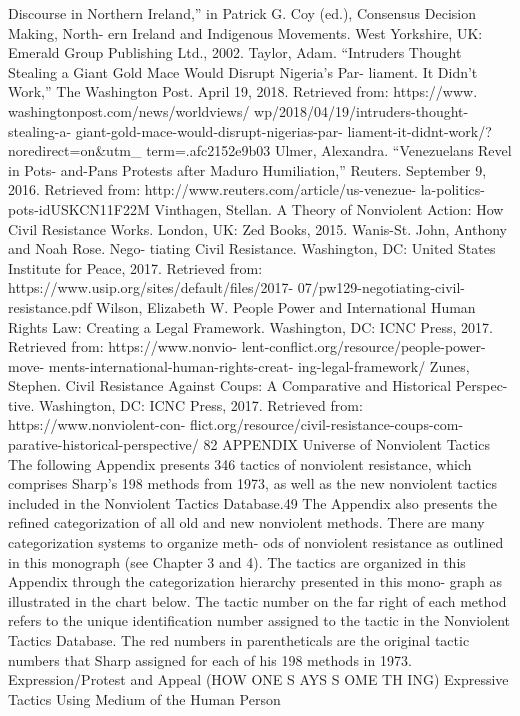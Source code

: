 \documentclass[twoside,a4paper,12pt,fleqn,openany]{extbook}
\begin{document}
Discourse in Northern Ireland,” in Patrick G.
Coy (ed.), Consensus Decision Making, North-
ern Ireland and Indigenous Movements. West
Yorkshire, UK: Emerald Group Publishing
Ltd., 2002.
Taylor, Adam. “Intruders Thought Stealing a
Giant Gold Mace Would Disrupt Nigeria’s Par-
liament. It Didn’t Work,” The Washington Post.
April 19, 2018. Retrieved from: https://www.
washingtonpost.com/news/worldviews/
wp/2018/04/19/intruders-thought-stealing-a-
giant-gold-mace-would-disrupt-nigerias-par-
liament-it-didnt-work/?noredirect=on&utm_
term=.afc2152e9b03
Ulmer, Alexandra. “Venezuelans Revel in Pots-
and-Pans Protests after Maduro Humiliation,”
Reuters. September 9, 2016. Retrieved from:
http://www.reuters.com/article/us-venezue-
la-politics-pots-idUSKCN11F22M
Vinthagen, Stellan. A Theory of Nonviolent
Action: How Civil Resistance Works. London,
UK: Zed Books, 2015.
Wanis-St. John, Anthony and Noah Rose. Nego-
tiating Civil Resistance. Washington, DC: United
States Institute for Peace, 2017. Retrieved from:
https://www.usip.org/sites/default/files/2017-
07/pw129-negotiating-civil-resistance.pdf
Wilson, Elizabeth W. People Power and
International Human Rights Law: Creating a
Legal Framework. Washington, DC: ICNC Press,
2017. Retrieved from: https://www.nonvio-
lent-conflict.org/resource/people-power-move-
ments-international-human-rights-creat-
ing-legal-framework/
Zunes, Stephen. Civil Resistance Against
Coups: A Comparative and Historical Perspec-
tive. Washington, DC: ICNC Press, 2017.
Retrieved from: https://www.nonviolent-con-
flict.org/resource/civil-resistance-coups-com-
parative-historical-perspective/
82
APPENDIX
Universe of Nonviolent Tactics
The following Appendix presents 346 tactics of nonviolent resistance, which comprises
Sharp’s 198 methods from 1973, as well as the new nonviolent tactics included in the
Nonviolent Tactics Database.49 The Appendix also presents the refined categorization of all
old and new nonviolent methods. There are many categorization systems to organize meth-
ods of nonviolent resistance as outlined in this monograph (see Chapter 3 and 4). The tactics
are organized in this Appendix through the categorization hierarchy presented in this mono-
graph as illustrated in the chart below.
The tactic number on the far right of each method refers to the unique identification
number assigned to the tactic in the Nonviolent Tactics Database.
The red numbers in parentheticals are the original tactic numbers that Sharp assigned
for each of his 198 methods in 1973.
Expression/Protest and Appeal
(HOW ONE S AYS S OME TH ING)
Expressive Tactics Using Medium of the Human Person
\end{document}
